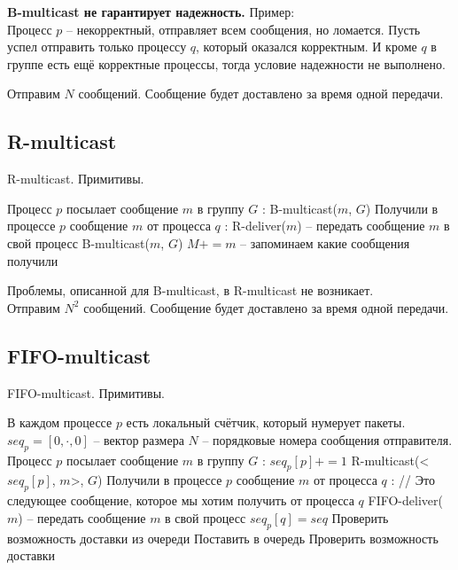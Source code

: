 \textbf{B-multicast не гарантирует надежность.} Пример: \\
Процесс $p$ -- некорректный, отправляет всем сообщения, но ломается. Пусть успел отправить только процессу $q$, который оказался корректным. И кроме $q$ в группе есть ещё корректные процессы, тогда условие надежности не выполнено.

Отправим $N$ сообщений. Сообщение будет доставлено за время одной передачи.


\subsection*{R-multicast}\label{b19:part2}

\begin{algorithm}
\caption{R-multicast. Примитивы.}
\begin{algorithmic}

\State Процесс $p$ посылает сообщение $m$ в группу $G$
:
	\State B-multicast($m$, $G$)
\EndProcedure
\State
\State Получили в процессе $p$ сообщение $m$ от процесса $q$
:
		\State R-deliver($m$) -- передать сообщение $m$ в свой процесс
		\State B-multicast($m$, $G$)
		\State $M += m$ -- запоминаем какие сообщения получили
	\EndIf
\EndProcedure

\end{algorithmic}
\end{algorithm}

Проблемы, описанной для B-multicast, в R-multicast не возникает. \\
Отправим $N^2$ сообщений. Сообщение будет доставлено за время одной передачи.

\newpage
\subsection*{FIFO-multicast}\label{b19:part3}

\begin{algorithm}
\caption{FIFO-multicast. Примитивы.}
\begin{algorithmic}

\State В каждом процессе $p$ есть локальный счётчик, который нумерует пакеты.
\State $seq_p = [0, \cdot, 0]$ -- вектор размера $N$ -- порядковые номера сообщения отправителя.
\State
\State Процесс $p$ посылает сообщение $m$ в группу $G$
:
	\State $seq_p[p] += 1$
	\State R-multicast(<$seq_p[p]$, $m$>, $G$)
\EndProcedure
\State
\State Получили в процессе $p$ сообщение $m$ от процесса $q$
:
		\State // Это следующее сообщение, которое мы хотим получить от процесса $q$
		\State FIFO-deliver($m$) -- передать сообщение $m$ в свой процесс
		\State $seq_p[q] = seq$
		Проверить возможность доставки из очереди
	\Else
		\State Поставить в очередь
		\State Проверить возможность доставки
	\EndIf
\EndProcedure

\end{algorithmic}
\end{algorithm}

